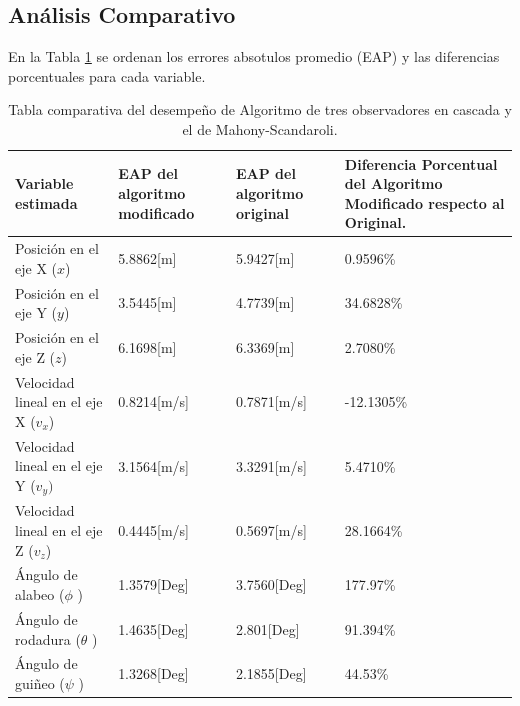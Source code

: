 \documentclass[conference]{IEEEtran}
\begin{document}
\subsection{Análisis Comparativo}
En la Tabla \ref{resultados_tb1} se ordenan los errores absotulos promedio (EAP) y las diferencias porcentuales para cada variable.\par
%
\begin{table}[!t]
\caption{Tabla comparativa del desempeño de Algoritmo de tres observadores en cascada y el de Mahony-Scandaroli.}
\label{resultados_tb1}
\begin{center}\scriptsize
\begin{tabular}{|p{0.6in}|p{0.7in}|p{0.7in}|p{0.7in}|} \hline
\textbf{Variable estimada}&\textbf{EAP del algoritmo modificado}&\textbf{EAP del algoritmo original}&\textbf{Diferencia Porcentual del Algoritmo Modificado respecto al Original.} \\ \hline
Posición en el eje X ($x$) &5.8862[m]&5.9427[m]&0.9596\%\\ \hline
Posición en el eje Y ($y$) &3.5445[m]&4.7739[m]&34.6828\%\\ \hline
Posición en el eje Z ($z$)&6.1698[m]&6.3369[m]&2.7080\%\\ \hline
Velocidad lineal en el eje X ($v_x$) &0.8214[m/s]&0.7871[m/s]&{-12.1305\%}\\ \hline
Velocidad lineal en el eje Y ($v_y)$&3.1564[m/s]&3.3291[m/s]&5.4710\%\\ \hline
Velocidad lineal en el eje Z ($v_z$)&0.4445[m/s]&0.5697[m/s]&28.1664\%\\ \hline
Ángulo de alabeo ($\phi$ )&1.3579[Deg]&3.7560[Deg]&177.97\%\\ \hline
Ángulo de rodadura ($\theta$ )&1.4635[Deg]&2.801[Deg]&91.394\%\\ \hline
Ángulo de guiñeo ($\psi$ )&1.3268[Deg]&2.1855[Deg]&44.53\%\\ \hline
\end{tabular}
\end{center}
\end{table}
\end{document}
